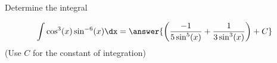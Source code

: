 \documentclass{ximera}
\author{Jason Miller}
\begin{document}
\begin{exercise}
Determine the integral

\[
\int \cos^{3}(x)\sin^{-6}(x) \dx= \answer{ \left(    \frac{-1}{5\sin^{5}(x)} + \frac{1}{3 \sin^{3}(x)}  \right) +C} 
\]
(Use $C$ for the constant of integration)

\end{exercise}
\end{document}
